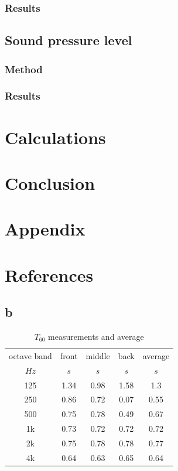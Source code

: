\documentclass{article}
\begin{document}
\subsubsection{Results}
\subsection{Sound pressure level}
\subsubsection{Method}
\subsubsection{Results}

\newpage
\section{Calculations}

\newpage
\section{Conclusion}

\newpage
\section{Appendix}

\newpage
\section{References}
	
\subsection{b}
\begin{table}
\begin{center}
\begin{tabular}{|c||c|c|c||c|}
\hline
octave band & front & middle & back & average	\\
$Hz$		&	$s$	&	$s$		&	$s$		&	$s$		\\
\hline
\hline
125			& 1.34	&	0.98	&	1.58	&	1.3		\\
\hline
250			& 0.86	&	0.72	&	0.07	&	0.55	\\
\hline
500			& 0.75	& 	0.78	&	0.49	&	0.67	\\
\hline
1k			& 0.73	&	0.72	&	0.72	&	0.72	\\
\hline
2k			& 0.75	&	0.78	&	0.78	&	0.77	\\
\hline
4k			& 0.64	&	0.63	&	0.65	& 	0.64	\\
\hline


\end{tabular}
\caption{$T_{60}$ measurements and average}
\label{tab:Tmeasurements}
\end{center}
\end{table}
\end{document}
